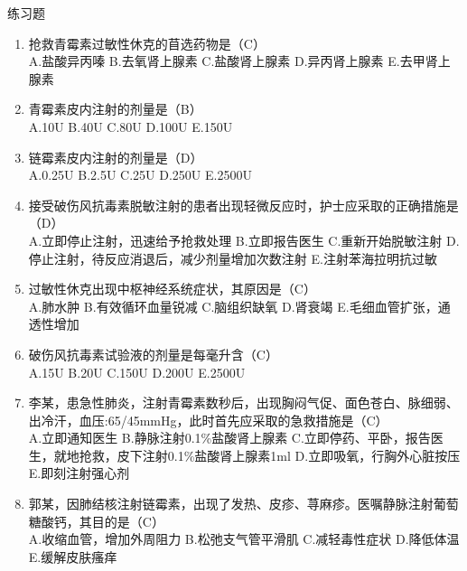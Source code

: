 \documentclass[11pt, a4paper]{ctexart}
\begin{document}
\begin{examplebox}{练习题}
\begin{enumerate}
    \item 抢救青霉素过敏性休克的苜选药物是（C）\\
    A.盐酸异丙嗪 \quad B.去氧肾上腺素 \quad C.盐酸肾上腺素 \quad D.异丙肾上腺素 \quad E.去甲肾上腺素
    \item 青霉素皮内注射的剂量是（B）\\
    A.10U \quad B.40U \quad C.80U \quad D.100U \quad E.150U
    \item 链霉素皮内注射的剂量是（D）\\
    A.0.25U \quad B.2.5U \quad C.25U \quad D.250U \quad E.2500U
    \item 接受破伤风抗毒素脱敏注射的患者出现轻微反应时，护士应采取的正确措施是（D）\\
    A.立即停止注射，迅速给予抢救处理 \quad B.立即报告医生 \quad C.重新开始脱敏注射 \quad D.停止注射，待反应消退后，减少剂量增加次数注射 \quad E.注射苯海拉明抗过敏
    \item 过敏性休克出现中枢神经系统症状，其原因是（C）\\
    A.肺水肿 \quad B.有效循环血量锐减 \quad C.脑组织缺氧 \quad D.肾衰竭 \quad E.毛细血管扩张，通透性增加
    \item 破伤风抗毒素试验液的剂量是每毫升含（C）\\
    A.15U \quad B.20U \quad C.150U \quad D.200U \quad E.2500U
    \item 李某，患急性肺炎，注射青霉素数秒后，出现胸闷气促、面色苍白、脉细弱、出冷汗，血压:65/45mmHg，此时首先应采取的急救措施是（C）\\
    A.立即通知医生 \quad B.静脉注射0.1\%盐酸肾上腺素 \quad C.立即停药、平卧，报告医生，就地抢救，皮下注射0.1\%盐酸肾上腺素1ml \quad D.立即吸氧，行胸外心脏按压 \quad E.即刻注射强心剂
    \item 郭某，因肺结核注射链霉素，出现了发热、皮疹、荨麻疹。医嘱静脉注射葡萄糖酸钙，其目的是（C）\\
    A.收缩血管，增加外周阻力 \quad B.松弛支气管平滑肌 \quad C.减轻毒性症状 \quad D.降低体温 \quad E.缓解皮肤瘙痒
\end{enumerate}
\end{examplebox}
\end{document}
